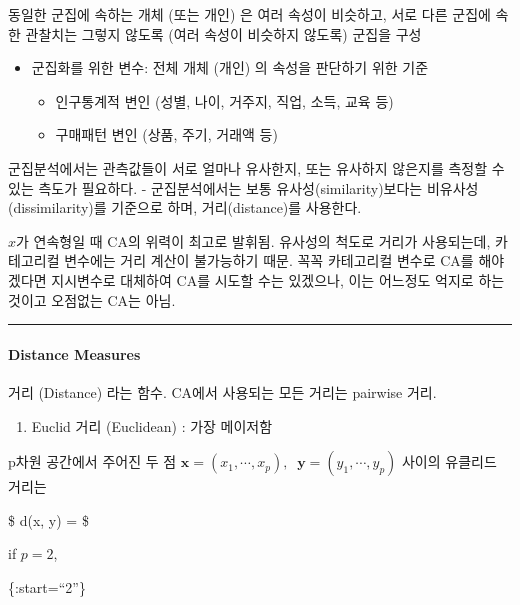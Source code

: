 \documentclass[
]{book}
\providecommand{\tightlist}{%
  \setlength{\itemsep}{0pt}\setlength{\parskip}{0pt}}
\begin{document}
{{{동일한 군집에 속하는 개체 (또는 개인) 은 여러 속성이 비슷하고, 서로 다른 군집에 속한 관찰치는 그렇지 않도록 (여러 속성이 비슷하지 않도록) 군집을 구성

\begin{itemize}
\tightlist
\item
  군집화를 위한 변수: 전체 개체 (개인) 의 속성을 판단하기 위한 기준

  \begin{itemize}
  \tightlist
  \item
    인구통계적 변인 (성별, 나이, 거주지, 직업, 소득, 교육 등)
  \item
    구매패턴 변인 (상품, 주기, 거래액 등)
  \end{itemize}
\end{itemize}

군집분석에서는 관측값들이 서로 얼마나 유사한지, 또는 유사하지 않은지를 측정할 수 있는 측도가 필요하다.
- 군집분석에서는 보통 유사성(similarity)보다는 비유사성(dissimilarity)를 기준으로 하며, 거리(distance)를 사용한다.

\(x\)가 연속형일 때 CA의 위력이 최고로 발휘됨. 유사성의 척도로 거리가 사용되는데, 카테고리컬 변수에는 거리 계산이 불가능하기 때문. 꼭꼭 카테고리컬 변수로 CA를 해야겠다면 지시변수로 대체하여 CA를 시도할 수는 있겠으나, 이는 어느정도 억지로 하는 것이고 오점없는 CA는 아님.

\begin{center}\rule{0.5\linewidth}{0.5pt}\end{center}

\hypertarget{distance-measures}{%
\paragraph{Distance Measures}\label{distance-measures}}

거리 (Distance) 라는 함수. CA에서 사용되는 모든 거리는 pairwise 거리.

\begin{enumerate}
\def\labelenumi{\arabic{enumi}.}
\tightlist
\item
  Euclid 거리 (Euclidean) : 가장 메이저함
\end{enumerate}

p차원 공간에서 주어진 두 점 \(\pmb x=(x_1 , \cdots, x_p), \; \; \pmb y=(y_1 , \cdots, y_p)\) 사이의 유클리드 거리는

\$
d(\pmb x, \pmb y) = 
\$

if \(p=2\),

\{:start=``2''\}

}}}
\end{document}
